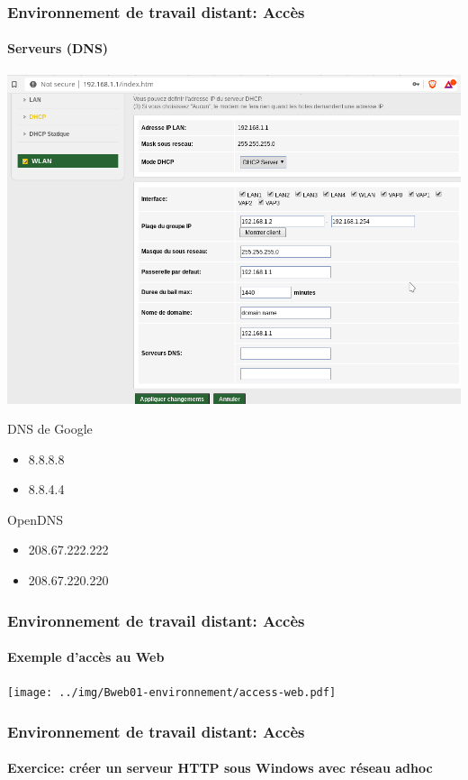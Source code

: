 \documentclass{beamer}
\begin{document}
\begin{frame}
\frametitle{Environnement de travail distant: Accès}
\framesubtitle{Serveurs (DNS)}

\begin{minipage}{0.65\textwidth}
	\includegraphics[width=\textwidth]{../img/Bweb01-environnement/dns.png}
\end{minipage}
%
\begin{minipage}{0.30\textwidth}
	DNS de Google
	\begin{itemize}
		\item 8.8.8.8
		\item 8.8.4.4
	\end{itemize}

	OpenDNS
	\begin{itemize}
		\item 208.67.222.222
		\item 208.67.220.220
	\end{itemize}

\end{minipage}

\end{frame}

\begin{frame}
\frametitle{Environnement de travail distant: Accès}
\framesubtitle{Exemple d'accès au Web}

\texttt{[image: ../img/Bweb01-environnement/access-web.pdf]}

\end{frame}


\begin{frame}
\frametitle{Environnement de travail distant: Accès}
\framesubtitle{Exercice: créer un serveur HTTP sous Windows avec réseau adhoc}




\end{frame}
\end{document}
